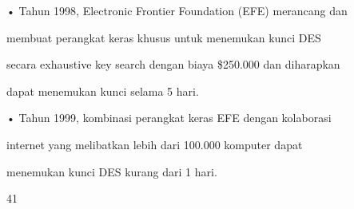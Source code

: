 \documentclass{article}
\begin{document}

• Tahun 1998, Electronic Frontier Foundation (EFE) merancang dan 

membuat perangkat keras khusus untuk menemukan kunci DES 

secara exhaustive key search dengan biaya \$250.000 dan diharapkan 

dapat menemukan kunci selama 5 hari. 

• Tahun 1999, kombinasi perangkat keras EFE dengan kolaborasi 

internet yang melibatkan lebih dari 100.000 komputer dapat 

menemukan kunci DES kurang dari 1 hari. 

41
\end{document}
